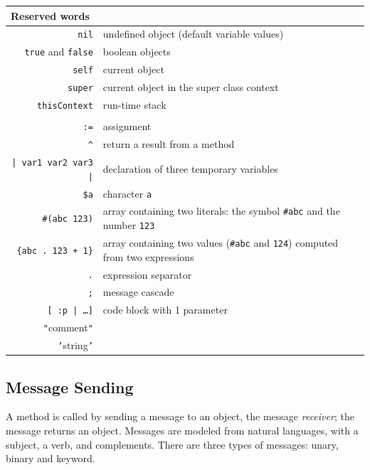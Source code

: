 \documentclass[notumble]{leaflet}
\newcommand{\code}[1]{\foreignlanguage{english}{\texttt{#1}}}
\begin{document}
\noindent
\begin{tabularx}{\linewidth}{@{}rX@{}}
        \toprule
        \multicolumn{2}{l}{Reserved words}\\
        \midrule
        \code{nil} & undefined object (default variable values)\\
        \code{true} {and}{} \code{false} & boolean objects\\
        \code{self} & current object\\
        \code{super} & current object in the super class context\\
        \code{thisContext} & run-time stack\\
        \addlinespace

        \toprule
        \multicolumn{2}{l}{Reserved characters}\\
        \midrule
        \code{:=} & {assignment} \\
        \code{\^} & return a result from a method \\
        \code{| var1 var2 var3 |} & declaration of three  temporary variables \\
        \code{\$a} & character \code{a} \\
        \code{\#(abc 123)} & array containing two literals: the symbol \code{\#abc} and the number \code{123} \\
        \code{\{abc . 123 + 1\}} & array containing two values (\code{\#abc} and \code{124}) computed from two expressions\\
        \code{.} & expression separator \\
        \code{;} & message cascade \\
        \code{[ :p | \dots ]} & code block with 1 parameter \\
        \code{"}{comment}\code{"} & \\
        \code{'}{string}\code{'} & \\
        \bottomrule
\end{tabularx}

\subsection{Message Sending}

A method is called by sending a message to an object, the message
\emph{receiver}; the message returns an object. Messages are modeled
from natural languages, with a subject, a verb, and complements. There
are three types of messages: unary, binary and keyword.
\end{document}
